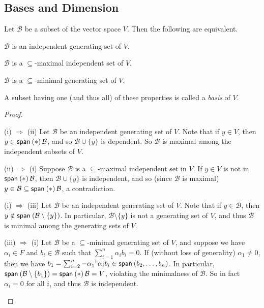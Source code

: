 \documentclass{memoir}
\begin{document}
\subsection*{Bases and Dimension}
\setcounter{section}{8}
\setcounter{dfn}{0}

\begin{prp} Let $\mathcal{B}$ be a subset of the vector space $V$. Then the following are equivalent.
\begin{enumerate*}
\item $\mathcal{B}$ is an independent generating set of $V$.
\item $\mathcal{B}$ is a $\subseteq$-maximal independent set of $V$.
\item $\mathcal{B}$ is a $\subseteq$-minimal generating set of $V$.
\end{enumerate*}
A subset having one (and thus all) of these properties is called a \emph{basis} of $V$.
\end{prp}

\begin{proof} \mbox{}
\begin{enumerate*}
\item[(i) $\Rightarrow$ (ii)] Let $\mathcal{B}$ be an independent generating set of $V$. Note that if $y \in V$, then $y \in \operatorname{\mathsf{span}}_{}\left(*\right){\mathcal{B}}$, and so $\mathcal{B} \cup \{y\}$ is dependent. So $\mathcal{B}$ is maximal among the independent subsets of $V$.
\item[(ii) $\Rightarrow$ (i)] Suppose $\mathcal{B}$ is a $\subseteq$-maximal independent set in $V$. If $y \in V$ is not in $\operatorname{\mathsf{span}}_{}\left(*\right){\mathcal{B}}$, then $\mathcal{B} \cup \{y\}$ is independent, and so (since $\mathcal{B}$ is maximal) $y \in \mathcal{B} \subseteq \operatorname{\mathsf{span}}_{}\left(*\right){\mathcal{B}}$, a contradiction.
\item[(i) $\Rightarrow$ (iii)] Let $\mathcal{B}$ be an independent generating set of $V$. Note that if $y \in \mathcal{B}$, then $y \notin \operatorname{\mathsf{span}}_{}\left(\mathcal{B} \setminus \{y\}\right)$. In particular, $\mathcal{B} \setminus \{y\}$ is not a generating set of $V$, and thus $\mathcal{B}$ is minimal among the generating sets of $V$.
\item[(iii) $\Rightarrow$ (i)] Let $\mathcal{B}$ be a $\subseteq$-minimal generating set of $V$, and suppose we have $\alpha_i \in F$ and $b_i \in \mathcal{B}$ such that $\sum_{i=1}^n \alpha_i b_i = 0$. If (without loss of generality) $\alpha_1 \neq 0$, then we have $b_1 = \sum_{i=2}^n -\alpha_1^{{\,\text{-}1}} \alpha_i b_i \in \operatorname{\mathsf{span}}_{}\left(b_2,\ldots,b_n\right)$. In particular, $\operatorname{\mathsf{span}}_{}\left(\mathcal{B} \setminus \{b_1\}\right) = \operatorname{\mathsf{span}}_{}\left(*\right){\mathcal{B}} = V$, violating the minimalness of $\mathcal{B}$. So in fact $\alpha_i = 0$ for all $i$, and thus $\mathcal{B}$ is independent. \qedhere
\end{enumerate*}
\end{proof}
\end{document}
